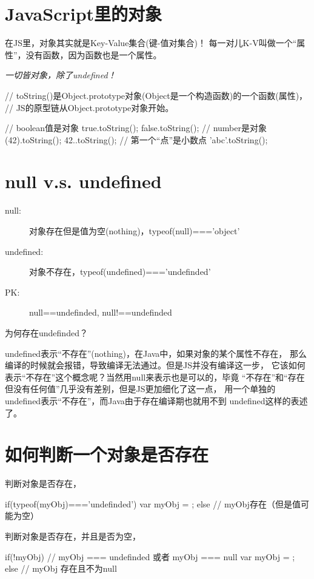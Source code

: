 \section[JavaScript里的对象]{JavaScript里的对象}
在JS里，对象其实就是Key-Value集合(键-值对集合)！
每一对儿K-V叫做一个“属性”，没有函数，因为函数也是一个属性。

\emph{一切皆对象，除了undefined！}

\begin{javascriptcode}
// toString()是Object.prototype对象(Object是一个构造函数)的一个函数(属性)，
// JS的原型链从Object.prototype对象开始。

// boolean值是对象
true.toString();
false.toString();
// number是对象
(42).toString();
42..toString(); // 第一个“点”是小数点
'abc'.toString();
\end{javascriptcode}

\section[null v.s. undefined]{null v.s. undefined}
\begin{description}
  \item[null: ] 对象存在但是值为空(nothing)，typeof(null)==='object'
  \item[undefined: ] 对象不存在，typeof(undefined)==='undefinded'
  \item[PK: ] null==undefinded, null!==undefinded
\end{description}

为何存在undefinded？

undefined表示“不存在”(nothing)，在Java中，如果对象的某个属性不存在，
那么编译的时候就会报错，导致编译无法通过。但是JS并没有编译这一步，
它该如何表示“不存在”这个概念呢？当然用null来表示也是可以的，毕竟
“不存在”和“存在但没有任何值”几乎没有差别，但是JS更加细化了这一点，
用一个单独的undefined表示“不存在”，而Java由于存在编译期也就用不到
undefined这样的表述了。


\section[如何判断一个对象是否存在]{如何判断一个对象是否存在}
判断对象是否存在，

\begin{javascriptcode}
if(typeof(myObj)==='undefinded') {
  var myObj = { };
} else {
  // myObj存在（但是值可能为空）
}
\end{javascriptcode}

判断对象是否存在，并且是否为空，

\begin{javascriptcode}
if(!myObj) {
  // myObj === undefinded 或者 myObj === null
  var myObj = { };
} else {
  // myObj 存在且不为null
}
\end{javascriptcode}